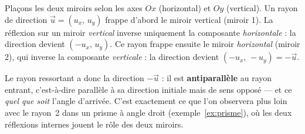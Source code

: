 \documentclass[11pt,a4paper]{article}
\begin{document}
\begin{center}
\end{center}

\begin{exemple}
Plaçons les deux miroirs selon les axes $Ox$ (horizontal) et $Oy$ (vertical). Un rayon de direction
$\vec{u} = (u_x,\,u_y)$ frappe d'abord le miroir vertical (miroir 1). La réflexion sur un miroir
\emph{vertical} inverse uniquement la composante \emph{horizontale} : la direction devient
$(-u_x,\,u_y)$. Ce rayon frappe ensuite le miroir \emph{horizontal} (miroir 2), qui inverse la
composante \emph{verticale} : la direction devient $(-u_x,\,-u_y) = -\vec{u}$.

\smallskip
Le rayon ressortant a donc la direction $-\vec{u}$ : il est \textbf{antiparallèle} au rayon entrant,
c'est-à-dire parallèle à sa direction initiale mais de sens opposé — et ce \emph{quel que soit}
l'angle d'arrivée. C'est exactement ce que l'on observera plus loin avec le rayon~2 dans un prisme
à angle droit (exemple~\ref{ex:prisme}), où les deux réflexions internes jouent le rôle des deux
miroirs.
\end{exemple}
\end{document}
